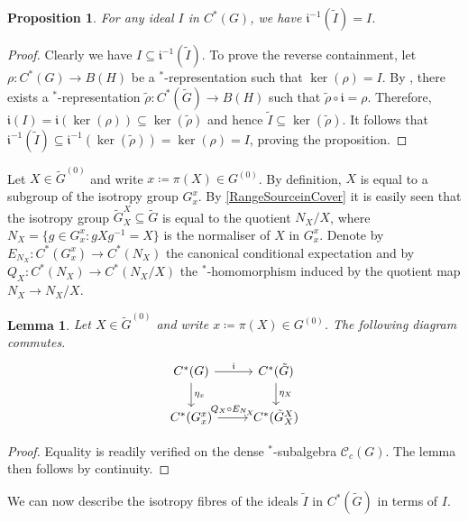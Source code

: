 \documentclass[11pt, oneside, reqno]{amsart}
\newcommand{\Gu}{G^{(0)}}
\newcommand{\cg}{\mathscr{C}_c(G)}
\newcommand{\tiG}{\tilde{G}}
\newcommand{\tiGu}{\tilde{G}^{(0)}}
\newcommand{\mfi}{\mathfrak i}
\newtheorem{lem}[thm]{Lemma}
\newtheorem{prp}[thm]{Proposition}
\theoremstyle{definition}
\theoremstyle{remark}
\numberwithin{equation}{section}
\begin{document}
\begin{prp}\label{Ideal1to1}
    For any ideal $I$ in $C^{*}(G)$, we have $\mfi^{-1}(\tilde{I}) = I$.
\end{prp}

\begin{proof}
    Clearly we have $I\subseteq \mfi^{-1}(\tilde{I})$. To prove the reverse containment, let $\rho \colon C^{*}(G)\to B(H)$ be a $^*$-representation such that $\ker(\rho) = I$. By \cite[Lemma~6.7]{BGHL}, there exists a $^*$-representation $\tilde{\rho} \colon C^{*}(\tiG)\to B(H)$ such that $\tilde{\rho}\circ \mfi = \rho$. Therefore, $\mfi(I) = \mfi(\ker(\rho))\subseteq \ker(\tilde{\rho})$ and hence $\tilde{I}\subseteq \ker(\tilde{\rho})$. It follows that $\mfi^{-1}(\tilde{I})\subseteq \mfi^{-1}(\ker(\tilde{\rho})) = \ker(\rho) = I$, proving the proposition.
\end{proof} 

Let $X \in \tiGu$ and write $ x \coloneq \pi(X) \in \Gu$. By definition, $X$ is equal to a subgroup of the isotropy group $G^{x}_{x}$. By \eqref{RangeSourceinCover} it is easily seen that the isotropy group $\tiG^{X}_{X} \subseteq \tiG$ is equal to the quotient $N_{X}/X$, where $N_{X} = \{g\in G^{x}_{x} \colon  gXg^{-1} = X\}$ is the normaliser of $X$ in $G^{x}_{x}$. Denote by $E_{N_{X}} \colon C^*(G^x_x) \to C^*(N_{X})$ the canonical conditional expectation and by $Q_{X} \colon C^{*}(N_{X})\to C^{*}(N_{X}/X)$ the $^*$-homomorphism induced by the quotient map $N_{X} \to N_{X}/X$.

\begin{lem}
    \label{restricted_restriction}
    Let $X\in \tiGu$ and write $x \coloneq \pi(X)\in \Gu$. The following diagram commutes.
    \[
    \begin{tikzcd}
    C^{*}(G) \arrow[r, "\mfi"] \arrow[d, "\eta_{x}"] & C^{*}(\tiG) \arrow[d, "\eta_{X}"] \\
    C^{*}(G^{x}_{x})     \arrow[r, "Q_X \circ E_{N_X}"]           & C^{*}(\tiG^{X}_{X})                        
    \end{tikzcd}
    \]
\end{lem}

\begin{proof}
     Equality is readily verified on the dense $^*$-subalgebra $\cg$. The lemma then follows by continuity.
\end{proof}
 
We can now describe the isotropy fibres of the ideals $\tilde{I}$ in $C^*(\tiG)$ in terms of $I$.
\end{document}
